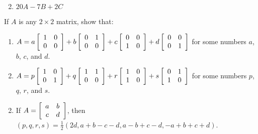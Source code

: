 \begin{multicols}{2}
\begin{ex}
\begin{enumerate}[label={\alph*.}]
\end{enumerate}
\begin{sol}
\begin{enumerate}[label={\alph*.}]
\setcounter{enumi}{1}
\item  $20A - 7B + 2C$

\end{enumerate}
\end{sol}
\end{ex}
\columnbreak
\begin{ex}
If $A$ is any $2 \times 2$ matrix, show that:


\begin{enumerate}[label={\alph*.}]
\item 
$A = a \left[ \begin{array}{rr}
1 & 0 \\
0 & 0
\end{array} \right] + 
b \left[ \begin{array}{rr}
0 & 1 \\
0 & 0
\end{array} \right] + 
c \left[ \begin{array}{rr}
0 & 0 \\
1 & 0
\end{array} \right] + 
d \left[ \begin{array}{rr}
0 & 0 \\
0 & 1
\end{array} \right]
$
 for some numbers $a$, $b$, $c$, and $d$.

\item 
$A = p \left[ \begin{array}{rr}
1 & 0 \\
0 & 1
\end{array} \right] + 
q \left[ \begin{array}{rr}
1 & 1 \\
0 & 0
\end{array} \right] + 
r \left[ \begin{array}{rr}
1 & 0 \\
1 & 0
\end{array} \right] + 
s \left[ \begin{array}{rr}
0 & 1 \\
1 & 0
\end{array} \right]
$
 for some numbers $p$, $q$, $r$, and $s$. 

\end{enumerate}
\begin{sol}
\begin{enumerate}[label={\alph*.}]
\setcounter{enumi}{1}
\item  If 
$A = \left[ \begin{array}{cc}
a & b \\
c & d
\end{array} \right]$, then $(p, q, r, s) = \frac{1}{2}(2d, a + b - c - d, a - b + c - d, -a + b + c + d)$.


\end{enumerate}
\end{sol}
\end{ex}
\end{multicols}
